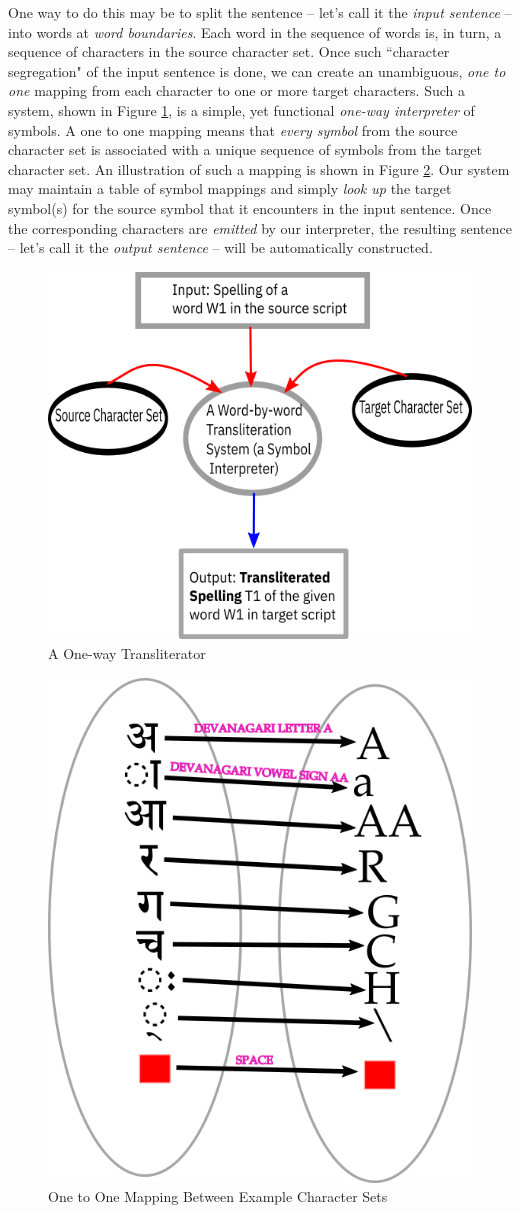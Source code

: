\documentclass[a4paper, 12pt]{article}
\begin{document}
One way to do this may be to split the sentence -- let's call it the \emph{input sentence} -- into words at \emph{word boundaries}. Each word in the sequence of words is, in turn, a sequence of characters in the source character set. Once such ``character segregation" of the input sentence is done, we can create an unambiguous, \emph{one to one} mapping from each character to one or more target characters. Such a system, shown in Figure \ref{fig: transliterator}, is a simple, yet functional \emph{one-way interpreter} of symbols. A one to one mapping means that \emph{every symbol} from the source character set is associated with a unique sequence of symbols from the target character set. An illustration of such a mapping is shown in Figure \ref{fig: injective-mapping-chars}. Our system may maintain a table of symbol mappings and simply \emph{look up} the target symbol(s) for the source symbol that it encounters in the input sentence. Once the corresponding characters are \emph{emitted} by our interpreter, the resulting sentence -- let's call it the \emph{output sentence} -- will be automatically constructed. 


\begin{figure}[htbp!]
    \centering
    \includegraphics[width=0.5\linewidth]{transliterator.png}
    \caption{A One-way Transliterator}
    \label{fig: transliterator}
\end{figure}


\begin{figure}[htbp!]
    \centering
    \includegraphics[width=0.3\linewidth]{injective-mapping-chars.png}
    \caption{One to One Mapping Between Example Character Sets}
    \label{fig: injective-mapping-chars}
\end{figure}
\end{document}
